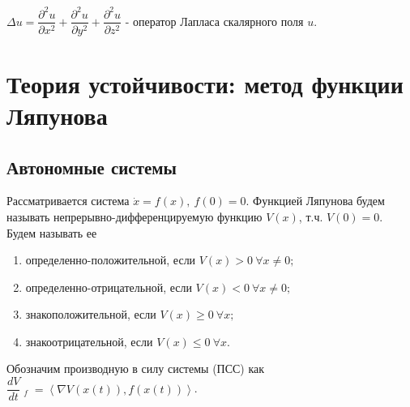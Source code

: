 \documentclass[a4paper,12pt]{scrartcl}
\DeclareMathOperator{\stick}{\biggl|}
\newcommand{\scalar}[2]{\left<#1,#2\right>}
\begin{document}
$\Delta u = \dfrac{\partial^2 u}{\partial x^2} + \dfrac{\partial^2 u}{\partial y^2} + \dfrac{\partial^2 u}{\partial z^2}$ - оператор Лапласа скалярного поля $u$.
\section{Теория устойчивости: метод функции Ляпунова}
\subsection{Автономные системы}
Рассматривается система $\dot{x} = f(x),\ f(0)=0$. Функцией Ляпунова будем называть непрерывно-дифференцируемую функцию $V(x)$, т.ч. $V(0)=0$. Будем называть ее
\begin{enumerate}
 \item определенно-положительной, если $V(x)>0\ \forall x\neq0;$
 \item определенно-отрицательной, если $V(x)<0\ \forall x\neq0;$
 \item знакоположительной, если $V(x)\geqslant0\ \forall x;$
 \item знакоотрицательной, если $V(x)\leqslant0\ \forall x.$
\end{enumerate}
Обозначим производную в силу системы (ПСС) как $\dfrac{dV}{dt}\stick_{f} = \scalar{\nabla V(x(t))}{f(x(t))}$.
\end{document}
